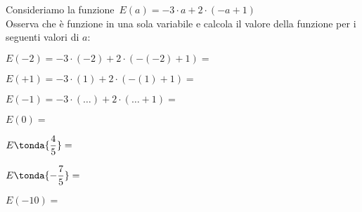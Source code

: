 \begin{esercizio}
\label{ese:8.13}
Consideriamo la funzione~\(E(a) = -3 \cdot a +2 \cdot (-a +1)\)\\
Osserva che è funzione in una sola variabile e calcola il valore della 
funzione per i seguenti valori di \(a\):
\begin{htmulticols}{2}
\begin{enumeratea}
\spazielenx
\item \(E(-2) =-3\cdot (-2)+2\cdot (-(-2)+1) =\)%
\item \(E(+1) =-3\cdot (1)+2\cdot(-(1)+1) =\)
\item \(E(-1) =-3\cdot (\ldots)+2\cdot (\ldots +1) =\)
\item \(E(0) =\)
\item \(E\tonda{\dfrac{4}{5}} =\)
\item \(E\tonda{-\dfrac{7}{5}} =\)
\item \(E(-10) =\)
\end{enumeratea}
\end{htmulticols}
\end{esercizio}

\pagebreak %

